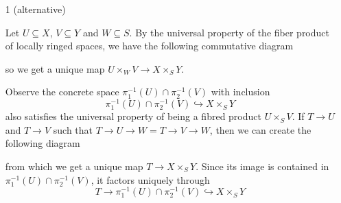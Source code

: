 \begin{exercise}{1}
\begin{enumerate}
    \item[1 (alternative)]{
            Let $U \subseteq X$, $V \subseteq Y$ and $W \subseteq S$. By the
            universal property of the fiber product of locally ringed spaces, we
            have the following commutative diagram
            \begin{center}
            \end{center}
            so we get a unique map
            $U \times_W V \rightarrow X \times_S Y$.

            Observe the concrete space $\pi^{-1}_1(U) \cap \pi^{-1}_2(V)$ with
            inclusion
            \begin{equation*}
                \pi^{-1}_1(U) \cap \pi^{-1}_2(V) \hookrightarrow X \times_S Y
            \end{equation*}
            also satisfies the universal property of being a fibred product
            $U \times_S V$. If $T \to U$ and $T \to V$ such that
            $T \to U \to W = T \to V \to W$, then
            we can create the following diagram
            \begin{center}
            \end{center}
            from which we get a unique map $T \to X \times_S Y$. Since its image
            is contained in $\pi^{-1}_1(U) \cap \pi^{-1}_2(V)$, it factors
            uniquely through
            \begin{equation*}
                T \to \pi^{-1}_1(U) \cap \pi^{-1}_2(V) \hookrightarrow X
                \times_S Y
            \end{equation*}

}
\end{enumerate}
\end{exercise}
